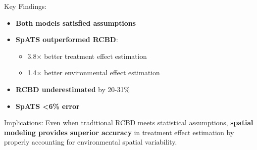 \documentclass[aspectratio=43]{beamer}
\begin{document}
\begin{frame}
\begin{columns}
        \begin{column}{0.5\textwidth}
            \begin{alertblock}{\small Key Findings:}
                \begin{itemize}
                    \footnotesize
                    \item \textbf{Both models satisfied assumptions}
                    \item \textbf{SpATS outperformed RCBD}:
                    \begin{itemize}
                        \scriptsize
                        \item 3.8× better treatment effect estimation
                        \item 1.4× better environmental effect estimation
                    \end{itemize}
                    \item \textbf{RCBD underestimated} by 20-31\%
                    \item \textbf{SpATS <6\% error}
                \end{itemize}
            \end{alertblock}
            
            \begin{block}{\small Implications:}
                \scriptsize
                Even when traditional RCBD meets statistical assumptions, \textbf{spatial modeling provides superior accuracy} in treatment effect estimation by properly accounting for environmental spatial variability.
            \end{block}
        \end{column}
    \end{columns}
\end{frame}
\end{document}
